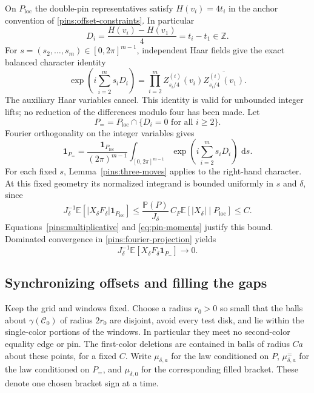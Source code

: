 \documentclass[11pt]{article}
\theoremstyle{definition}
\theoremstyle{remark}
\numberwithin{equation}{section}
\begin{document}
On $P_{\mathrm{loc}}$ the double-pin representatives satisfy
$H(v_i)=4t_i$ in the anchor convention of
\eqref{pins:offset-constraints}.  In particular
\[
 D_i=\frac{H(v_i)-H(v_1)}4=t_i-t_1\in\mathbb Z.
\]
For $s=(s_2,\ldots,s_m)\in[0,2\pi]^{m-1}$, independent Haar
fields give the exact balanced character identity
\begin{equation}\label{pins:balanced-characters}
 \exp\left(i\sum_{i=2}^m s_i D_i\right)
 =\prod_{i=2}^m
 Z^{(i)}_{s_i/4}(v_i)\overline{Z^{(i)}_{s_i/4}(v_1)}.
\end{equation}
The auxiliary Haar variables cancel.  This identity is valid for
unbounded integer lifts; no reduction of the differences modulo four
has been made.  Let
\begin{equation}\label{pins:common-offset-event}
 P_= =P_{\mathrm{loc}}\cap\{D_i=0\text{ for all }i\ge2\}.
\end{equation}
Fourier orthogonality on the integer variables gives
\begin{equation}\label{pins:fourier-projection}
 \mathbf 1_{P_=}=
 \frac{\mathbf 1_{P_{\mathrm{loc}}}}{(2\pi)^{m-1}}
 \int_{[0,2\pi]^{m-1}}
       \exp\left(i\sum_{i=2}^m s_iD_i\right)\,\,\mathrm d s.
\end{equation}
For each fixed $s$, Lemma~\ref{pins:three-moves} applies to the
right-hand character.  At this fixed geometry its normalized integrand
is bounded uniformly in $s$ and $\delta$, since
\[
 J_\delta^{-1}\mathbb E[|X_\delta F_\delta|\mathbf 1_{P_{\mathrm{loc}}}]
 \le \frac{\mathbb P(P)}{J_\delta}\,C_F
       \mathbb E[|X_\delta|\mid P_{\mathrm{loc}}]\le C.
\]
Equations~\eqref{pins:multiplicative} and \eqref{eq:pin-moments}
justify this bound.  Dominated convergence in
\eqref{pins:fourier-projection} yields
\begin{equation}\label{pins:common-offset-numerator}
 J_\delta^{-1}\mathbb E[X_\delta F_\delta\mathbf 1_{P_=}]
 \longrightarrow0.
\end{equation}

\subsection{Synchronizing offsets and filling the gaps}

Keep the grid and windows fixed.  Choose a radius $r_0>0$ so small
that the balls about $\gamma(\mathcal C_0)$ of radius $2r_0$ are
disjoint, avoid every test disk, and lie within the single-color portions
of the windows.  In particular they meet no second-color equality
edge or pin.  The first-color deletions are contained in balls of
radius $Ca$ about these points, for a fixed $C$.  Write
$\mu_{\delta,a}$ for the law conditioned on $P$,
$\mu_{\delta,a}^{=}$ for the law conditioned on $P_=$, and
$\mu_{\delta,0}$ for the corresponding filled bracket.  These denote
one chosen bracket sign at a time.
\end{document}

